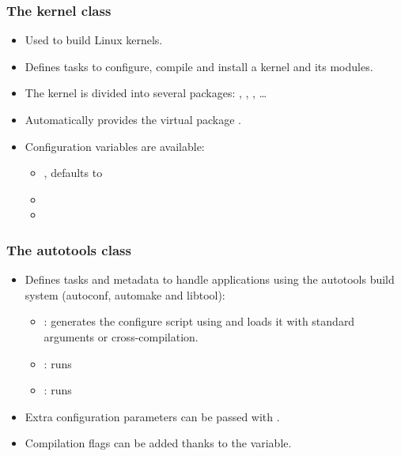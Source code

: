 \begin{frame}
  \frametitle{The kernel class}
  \begin{itemize}
    \item Used to build Linux kernels.
    \item Defines tasks to configure, compile and install a kernel and
          its modules.
    \item The kernel is divided into several packages: ,
          , ,
          \dots
    \item Automatically provides the virtual package
          .
    \item Configuration variables are available:
    \begin{itemize}
      \item {}, defaults to 
      \item {}
      \item {}
    \end{itemize}
  \end{itemize}
\end{frame}

\begin{frame}
  \frametitle{The autotools class}
  \begin{itemize}
    \item Defines tasks and metadata to handle applications using the
          autotools build system (autoconf, automake and libtool):
    \begin{itemize}
      \item {}: generates the configure script using
             and loads it with standard arguments or
            cross-compilation.
      \item {}: runs 
      \item {}: runs 
    \end{itemize}
    \item Extra configuration parameters can be passed with
          .
    \item Compilation flags can be added thanks to the
           variable.
  \end{itemize}
\end{frame}

